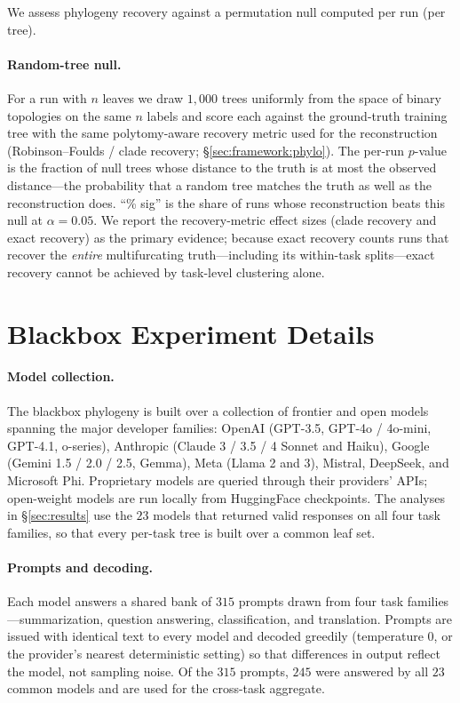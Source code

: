 \documentclass{article}
\theoremstyle{definition}
\theoremstyle{plain}
\begin{document}
We assess phylogeny recovery against a permutation null computed per run (per tree).

\paragraph{Random-tree null.} For a run with $n$ leaves we draw $1{,}000$ trees uniformly from the space
of binary topologies on the same $n$ labels and score each against the ground-truth training tree with
the same polytomy-aware recovery metric used for the reconstruction (Robinson--Foulds / clade
recovery; \S\ref{sec:framework:phylo}). The per-run $p$-value is the fraction of null trees whose
distance to the truth is at most the observed distance---the probability that a random tree matches the
truth as well as the reconstruction does. ``\% sig'' is the share of runs whose reconstruction beats
this null at $\alpha=0.05$. We report the recovery-metric effect sizes (clade recovery and exact recovery)
as the primary evidence; because exact recovery counts runs that recover the \emph{entire} multifurcating
truth---including its within-task splits---exact recovery cannot be achieved by task-level clustering
alone.

\section{Blackbox Experiment Details}
\label{app:blackbox}

\paragraph{Model collection.} The blackbox phylogeny is built over a collection of frontier and open
models spanning the major developer families: OpenAI (GPT-3.5, GPT-4o / 4o-mini, GPT-4.1, o-series),
Anthropic (Claude 3 / 3.5 / 4 Sonnet and Haiku), Google (Gemini 1.5 / 2.0 / 2.5, Gemma), Meta (Llama 2
and 3), Mistral, DeepSeek, and Microsoft Phi. Proprietary models are queried through their providers'
APIs; open-weight models are run locally from HuggingFace checkpoints. The analyses in
\S\ref{sec:results} use the $23$ models that returned valid responses on all four task
families, so that every per-task tree is built over a common leaf set.

\paragraph{Prompts and decoding.} Each model answers a shared bank of $315$ prompts drawn from four task
families---summarization, question answering, classification, and translation. Prompts are issued with
identical text to every model and decoded greedily (temperature $0$, or the provider's nearest
deterministic setting) so that differences in output reflect the model, not sampling noise. Of the
$315$ prompts, $245$ were answered by all $23$ common models and are used for the cross-task aggregate.
\end{document}
